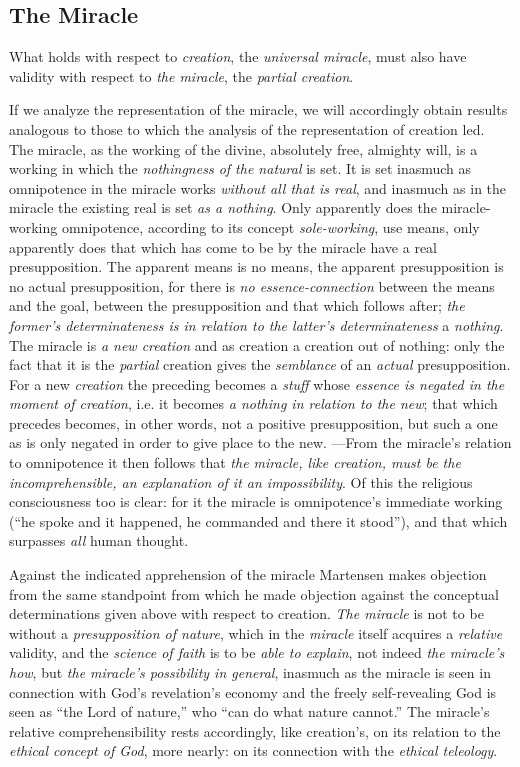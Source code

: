 \documentclass[12pt,a4paper]{book}
\begin{document}
\subsection{The Miracle}
\label{ssec:miracle}

What holds with respect to \emph{creation}, the \emph{universal miracle}, must also have
validity with respect to \emph{the miracle}, the \emph{partial creation}.

If we analyze the representation of the miracle, we will accordingly obtain results
analogous to those to which the analysis of the representation of creation led. The
miracle, as the working of the divine, absolutely free, almighty will, is a working
in which the \emph{nothingness of the natural} is set. It is set inasmuch as omnipotence in
the miracle works \emph{without all that is real}, and inasmuch as in the miracle the
existing real is set \emph{as a nothing}. Only apparently does the miracle-working
omnipotence, according to its concept \emph{sole-working}, use means, only apparently
does that which has come to be by the miracle have a real presupposition. The apparent
means is no means, the apparent presupposition is no actual presupposition, for there
is \emph{no essence-connection} between the means and the goal, between the presupposition and
that which follows after; \emph{the former's determinateness is in relation to the latter's
determinateness} a \emph{nothing}. The miracle is \emph{a new creation} and as creation a creation out
of nothing: only the fact that it is the \emph{partial} creation gives the \emph{semblance} of an
\emph{actual} presupposition. For a new \emph{creation} the preceding becomes a \emph{stuff} whose \emph{essence is
negated in the moment of creation}, i.e. it becomes \emph{a nothing in relation to the new};
that which precedes becomes, in other words, not a positive presupposition, but such a
one as is only negated in order to give place to the new. ---From the miracle's relation
to omnipotence it then follows that \emph{the miracle, like creation, must be the
incomprehensible, an explanation of it an impossibility}. Of this the religious
consciousness too is clear: for it the miracle is omnipotence's immediate working (``he
spoke and it happened, he commanded and there it stood''), and that which surpasses
\emph{all} human thought.

Against the indicated apprehension of the miracle Martensen makes objection from the
same standpoint from which he made objection against the conceptual determinations given
above with respect to creation. \emph{The miracle} is not to be without a \emph{presupposition of
nature}, which in the \emph{miracle} itself acquires a \emph{relative} validity, and the \emph{science of
faith} is to be \emph{able to explain}, not indeed \emph{the miracle's how}, but \emph{the miracle's
possibility in general}, inasmuch as the miracle is seen in connection with God's
revelation's economy and the freely self-revealing God is seen as ``the Lord of nature,''
who ``can do what nature cannot.'' The miracle's relative comprehensibility rests
accordingly, like creation's, on its relation to the \emph{ethical concept of God}, more nearly:
on its connection with the \emph{ethical teleology}.
\end{document}

